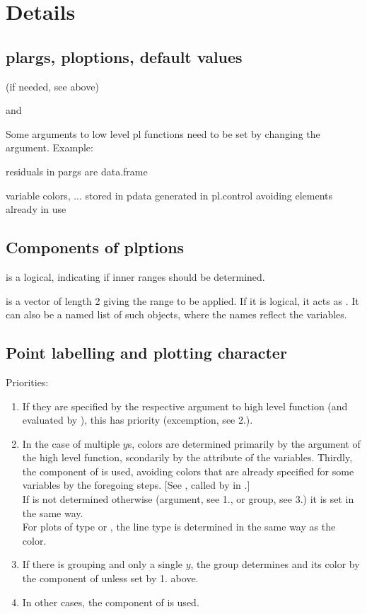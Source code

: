\documentclass[11pt]{article}\usepackage[]{graphicx}\usepackage[]{color}
\begin{document}
\section{Details}

\subsection{plargs, ploptions, default values} 
(if needed, see above)

 and 

Some arguments to low level pl functions need to be set by changing
the  argument.
Example:

residuals in pargs are data.frame

variable colors, ... stored in pdata
generated in pl.control avoiding elements already in use 

\subsection{Components of plptions}

 is a logical, indicating if inner ranges
should be determined.

 is a vector of length 2 giving the range to be
applied. If it is logical, it acts as .
It can also be a named list of such objects, where the names reflect the 
variables.

\subsection{Point labelling and plotting character}
Priorities:
\begin{enumerate}
\item 
  If they are specified by the respective argument to high level  
  function (and evaluated by ), this has priority
  (excemption, see 2.).
\item
  In the case of multiple $y$s, colors are determined primarily by 
  the argument  of the high level  function, 
  scondarily by the  attribute of the variables. 
  Thirdly, the  component of  is used,
  avoiding colors that are already specified for some variables by the
  foregoing steps. 
  [See , called by  in 
  .]\\
  If  is not determined otherwise (argument, see 1., or group,
  see 3.) it is set in the same way.\\
  For plots of type  or , the line type  is determined 
  in the same way as the color.
\item
  If there is grouping and only a single $y$, the group determines 
  and its color by the  component of  unless set
  by 1. above.
\item
  In other cases, the  component of  is used.
\end{enumerate}
\end{document}
